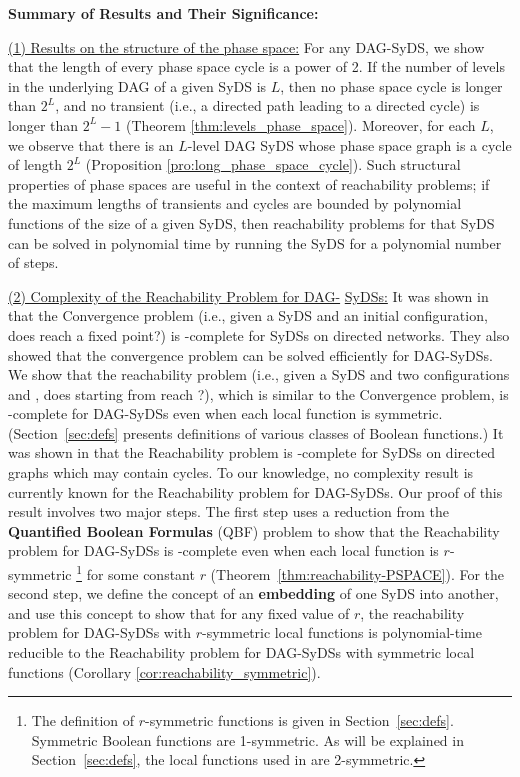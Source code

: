 \smallskip

\noindent
\textbf{Summary of Results and Their Significance:}

\smallskip

\noindent
\underline{(1) Results on the structure of the phase space:}
For any DAG-SyDS, we show that
the length of every phase space cycle is a power of 2.
If the number of levels in the underlying DAG of a given SyDS is $L$,
then no phase space cycle is longer than $2^L$,
and no transient (i.e., a directed path leading to a directed
cycle) is longer than $2^L-1$
(Theorem \ref{thm:levels_phase_space}).
Moreover, for each $L$, we observe that
there is an $L$-level DAG SyDS whose phase 
space graph is a cycle of length $2^L$
(Proposition \ref{pro:long_phase_space_cycle}).
Such structural properties of phase spaces are useful in the context of
reachability problems; if the maximum lengths of transients
and cycles are bounded by polynomial functions of the size of a given SyDS,
then reachability problems for that SyDS can be solved in polynomial time
by running the SyDS for a polynomial number of steps.

\smallskip

\noindent
\underline{(2) Complexity of the Reachability Problem for DAG-}\newline
\underline{SyDSs:} 
It was shown in
\cite{Chistikov-etal-2020} that the Convergence problem
(i.e., given a SyDS \cals{} and an initial configuration,
does \cals{} reach a fixed point?) is \cpsp-complete
for SyDSs on directed networks.
They also showed that the convergence problem can be solved efficiently
for DAG-SyDSs.
We show that the reachability problem
(i.e., given a SyDS \cals{} and two configurations \calc{} and \cald{},
does \cals{} starting from \calc{} reach \cald{}?),
which is similar to the Convergence problem, 
is \cpsp-complete for DAG-SyDSs even
when each local function is symmetric.
(Section~\ref{sec:defs} presents definitions of various classes
of Boolean functions.)
It was shown in \cite{OU-2017} that the Reachability
problem is \cpsp-complete for SyDSs on directed graphs 
which may contain cycles.
To our knowledge, no complexity result is currently known for
the Reachability problem for DAG-SyDSs.
Our proof of this result involves two major steps.
The first step uses a reduction from the \textbf{Quantified Boolean Formulas}
(QBF) problem \cite{GJ-1979} to show that the Reachability problem for DAG-SyDSs is
\cpsp-complete even when each local function is $r$-symmetric
\footnote{The definition of $r$-symmetric functions is given in
Section~\ref{sec:defs}. Symmetric Boolean functions
are 1-symmetric. As will be explained in Section~\ref{sec:defs},
the local functions used in \cite{Chistikov-etal-2020} are
2-symmetric.}
for some constant $r$ (Theorem~\ref{thm:reachability-PSPACE}).
For the second step,
we define the concept of an \textbf{embedding} of one SyDS into another,
and use this concept to show that
for any fixed value of $r$, 
the reachability problem for DAG-SyDSs with $r$-symmetric local functions 
is polynomial-time reducible to the Reachability problem for DAG-SyDSs with
symmetric  local functions (Corollary \ref{cor:reachability_symmetric}).

